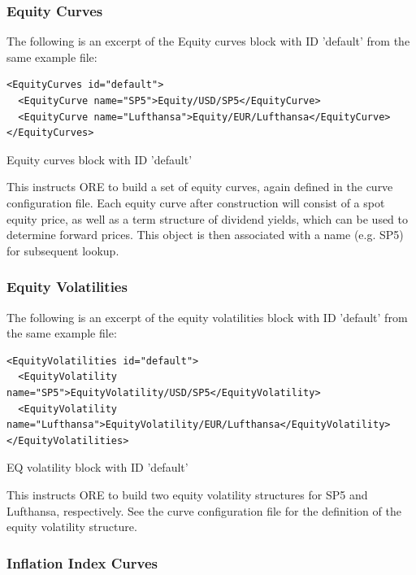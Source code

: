 \documentclass[12pt, a4paper]{article}
\begin{document}
\subsubsection{Equity Curves}
The following is an excerpt of the Equity curves block with ID 'default' from the same example file:

\begin{listing}[H]
\begin{verbatim}
<EquityCurves id="default">
  <EquityCurve name="SP5">Equity/USD/SP5</EquityCurve>
  <EquityCurve name="Lufthansa">Equity/EUR/Lufthansa</EquityCurve>
</EquityCurves>
\end{verbatim}
\caption{Equity curves block with ID 'default'}
\label{lst:eqcurve_spec}
\end{listing}

This instructs ORE to build a set of equity curves, again defined in the curve configuration file. Each equity curve 
after construction will consist of a spot equity price, as well as a term structure of dividend yields, which can be 
used to determine forward prices. This object is then associated with a name (e.g. SP5) for subsequent lookup. 

\subsubsection{Equity Volatilities}

The following is an excerpt of the equity volatilities block with ID 'default' from the same example file:

\begin{listing}[H]
\begin{verbatim}
<EquityVolatilities id="default">
  <EquityVolatility name="SP5">EquityVolatility/USD/SP5</EquityVolatility>
  <EquityVolatility name="Lufthansa">EquityVolatility/EUR/Lufthansa</EquityVolatility>
</EquityVolatilities>
\end{verbatim}
\caption{EQ volatility block with ID 'default'}
\label{lst:eqvol_spec}
\end{listing}

This instructs ORE to build two equity volatility structures for SP5 and Lufthansa, respectively. See the curve
configuration file for the definition of the equity volatility structure.


\subsubsection{Inflation Index Curves}
\end{document}
